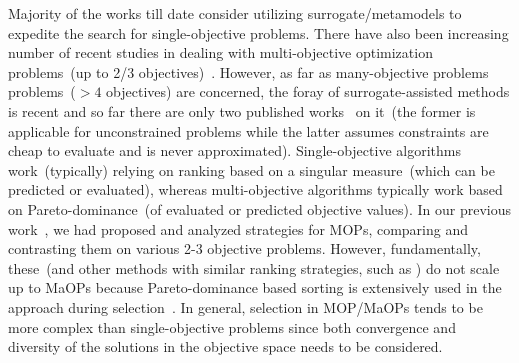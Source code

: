 \documentclass[twocolumn,10pt]{asme2ej}
\begin{document}
\begin{enumerate}

{\color{blue}
\item Majority of the works till date consider utilizing surrogate/metamodels to expedite the search for single-objective problems. There have also been increasing number of recent studies in dealing with multi-objective optimization problems~(up to 2/3 objectives)~\cite{Knowles2008}. However, as far as many-objective problems problems~($>4$ objectives) are concerned, the foray of surrogate-assisted methods is recent and so far there are only two published works~\cite{KHTchugh2016krvea,KHTchugh2016const} on it~(the former is applicable for unconstrained problems while the latter assumes constraints are cheap to evaluate and is never approximated). Single-objective algorithms work~(typically) relying on ranking based on a singular measure~(which can be predicted or evaluated), whereas multi-objective algorithms typically work based on Pareto-dominance~(of evaluated or predicted objective values). In our previous work~\cite{KHTjmd2016}, we had proposed and analyzed strategies for MOPs, comparing and contrasting them on various 2-3 objective problems. However, fundamentally, these~(and other methods with similar ranking strategies, such as \cite{KHTknowles2006pha}) do not scale up to MaOPs because Pareto-dominance based sorting is extensively used in the approach during selection~\cite{KHTishibuchi2008evolutionary}. In general, selection in MOP/MaOPs tends to be more complex than single-objective problems since both convergence and diversity of the solutions in the objective space needs to be considered.
}



\end{enumerate}
\end{document}
